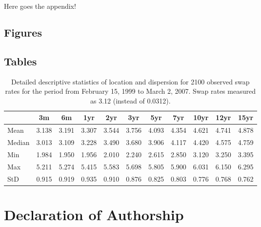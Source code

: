 \documentclass[a4paper,11pt]{article}
\begin{document}
Here goes the appendix!

\hypertarget{figures}{%
\subsection{Figures}\label{figures}}

\hypertarget{tables}{%
\subsection{Tables}\label{tables}}
\begin{table}[ht]
    \begin{center}
        {\footnotesize
        \begin{tabular}{l|cccccccccc}
        \hline \hline
                        & 3m    & 6m    & 1yr   & 2yr   & 3yr   & 5yr   & 7yr   & 10yr  & 12yr  & 15yr   \\
            \hline
                Mean   & 3.138 & 3.191 & 3.307 & 3.544 & 3.756 & 4.093 & 4.354 & 4.621 & 4.741 & 4.878  \\
                Median & 3.013 & 3.109 & 3.228 & 3.490 & 3.680 & 3.906 & 4.117 & 4.420 & 4.575 & 4.759  \\
                Min    & 1.984 & 1.950 & 1.956 & 2.010 & 2.240 & 2.615 & 2.850 & 3.120 & 3.250 & 3.395  \\
                Max    & 5.211 & 5.274 & 5.415 & 5.583 & 5.698 & 5.805 & 5.900 & 6.031 & 6.150 & 6.295  \\
                StD    & 0.915 & 0.919 & 0.935 & 0.910 & 0.876 & 0.825 & 0.803 & 0.776 & 0.768 & 0.762  \\
            \hline \hline
        \end{tabular}}
    \end{center}
    \caption{Detailed descriptive statistics of location and dispersion for
    2100 observed swap rates for the period from
    February 15, 1999 to March 2, 2007. Swap rates measured as 3.12 (instead of 0.0312).}
    \label{tab:apptable}
\end{table}
\newpage





\newpage
\thispagestyle{empty}
\hypertarget{declaration-of-authorship}{%
\section*{Declaration of Authorship}\label{declaration-of-authorship}}
\end{document}
